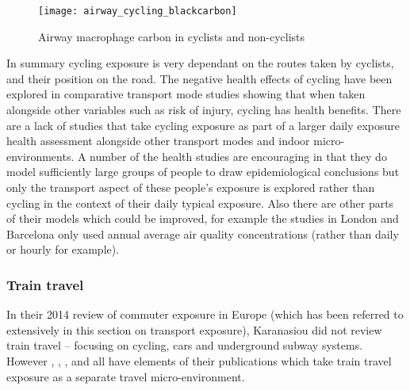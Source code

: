 \begin{figure}[H]
\centering
\texttt{[image: airway\_cycling\_blackcarbon]}
\caption{Airway macrophage carbon in cyclists and non-cyclists}
\label{fig:airway_cycling_blackcarbon}
\end{figure}

In summary cycling exposure is very dependant on the routes taken by cyclists, and their position on the road. The negative health effects of cycling have been explored in comparative transport mode studies showing that when taken alongside other variables such as risk of injury, cycling has health benefits. There are a lack of studies that take cycling exposure as part of a larger daily exposure health assessment alongside other transport modes and indoor micro-environments. A number of the health studies are encouraging in that they do model sufficiently large groups of people to draw epidemiological conclusions but only the transport aspect of these people's exposure is explored rather than cycling in the context of their daily typical exposure. Also there are other parts of their models which could be improved, for example the studies in London and Barcelona only used annual average air quality concentrations (rather than daily or hourly for example).


\subsubsection{Train travel}
\label{sec:train}

In their 2014 review of commuter exposure in Europe (which has been referred to extensively in this section on transport exposure), Karanasiou did not review train travel -- focusing on cycling, cars and underground subway systems. However \cite{Nasir2009}, \cite{Colbeck2010a}, \cite{Dons2011}, \cite{Ragettli2013} and \cite{Knibbs2011} all have elements of their publications which take train travel exposure as a separate travel micro-environment.

